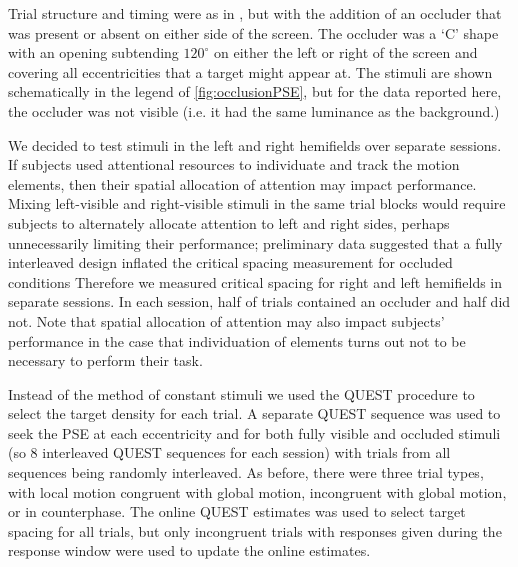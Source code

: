\documentclass[../manuscript]{subfiles}
\begin{document}


Trial structure and timing were as in , but with the addition of an occluder that was present or absent on either side of the screen. The occluder was a `C' shape with an opening subtending $120^\circ$ on either the left or right of the screen and covering all eccentricities that a target might appear at. The stimuli are shown schematically in the legend of \autoref{fig:occlusionPSE}, but for the data reported here, the occluder was not visible (i.e. it had the same luminance as the background.)

We decided to test stimuli in the left and right hemifields over separate sessions. If subjects used attentional resources to individuate and track the motion elements, then their spatial allocation of attention may impact performance. Mixing left-visible and right-visible stimuli in the same trial blocks would require subjects to alternately allocate attention to left and right sides, perhaps unnecessarily limiting their performance; preliminary data suggested that a fully interleaved design inflated the critical spacing measurement for occluded conditions  Therefore we measured critical spacing for right and left hemifields in separate sessions. In each session, half of trials contained an occluder and half did not. Note that spatial allocation of attention may also impact subjects' performance in the case that individuation of elements turns out not to be necessary to perform their task.

Instead of the method of constant stimuli we used the QUEST procedure \citep{Watson:1983hc} to select the target density for each trial. A separate QUEST sequence was used to seek the PSE at each eccentricity and for both fully visible and occluded stimuli (so 8 interleaved QUEST sequences for each session) with trials from all sequences being randomly interleaved. As before, there were three trial types, with local motion congruent with global motion, incongruent with global motion, or in counterphase. The online QUEST estimates was used to select target spacing for all trials, but only incongruent trials with responses given during the response window were used to update the online estimates.
\end{document}
